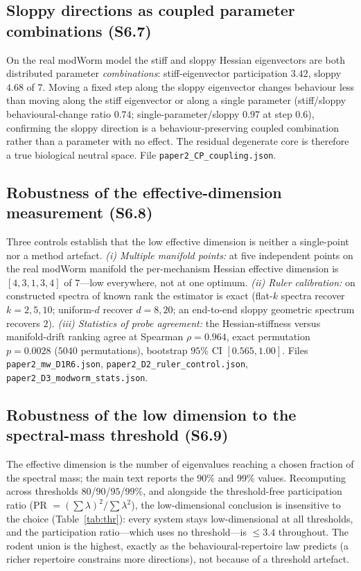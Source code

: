 \documentclass[11pt]{article}
\begin{document}
\subsection{Sloppy directions as coupled parameter combinations (S6.7)}
On the real modWorm model the stiff and sloppy Hessian eigenvectors are both distributed parameter \emph{combinations}: stiff-eigenvector participation $3.42$, sloppy $4.68$ of $7$. Moving a fixed step along the sloppy eigenvector changes behaviour less than moving along the stiff eigenvector or along a single parameter (stiff/sloppy behavioural-change ratio $0.74$; single-parameter/sloppy $0.97$ at step $0.6$), confirming the sloppy direction is a behaviour-preserving coupled combination rather than a parameter with no effect. The residual degenerate core is therefore a true biological neutral space. File \texttt{paper2\_CP\_coupling.json}.

\subsection{Robustness of the effective-dimension measurement (S6.8)}
Three controls establish that the low effective dimension is neither a single-point nor a method artefact. \emph{(i) Multiple manifold points:} at five independent points on the real modWorm manifold the per-mechanism Hessian effective dimension is $[4,3,1,3,4]$ of $7$---low everywhere, not at one optimum. \emph{(ii) Ruler calibration:} on constructed spectra of known rank the estimator is exact (flat-$k$ spectra recover $k{=}2,5,10$; uniform-$d$ recover $d{=}8,20$; an end-to-end sloppy geometric spectrum recovers $2$). \emph{(iii) Statistics of probe agreement:} the Hessian-stiffness versus manifold-drift ranking agree at Spearman $\rho{=}0.964$, exact permutation $p{=}0.0028$ ($5040$ permutations), bootstrap $95\%$ CI $[0.565,1.00]$. Files \texttt{paper2\_mw\_D1R6.json}, \texttt{paper2\_D2\_ruler\_control.json}, \texttt{paper2\_D3\_modworm\_stats.json}.

\subsection{Robustness of the low dimension to the spectral-mass threshold (S6.9)}
The effective dimension is the number of eigenvalues reaching a chosen fraction of the spectral mass; the main text reports the $90\%$ and $99\%$ values. Recomputing across thresholds $80$/$90$/$95$/$99\%$, and alongside the threshold-free participation ratio (PR $=(\sum\lambda)^2/\sum\lambda^2$), the low-dimensional conclusion is insensitive to the choice (Table~\ref{tab:thr}): every system stays low-dimensional at all thresholds, and the participation ratio---which uses no threshold---is $\le 3.4$ throughout. The rodent union is the highest, exactly as the behavioural-repertoire law predicts (a richer repertoire constrains more directions), not because of a threshold artefact.
\end{document}

